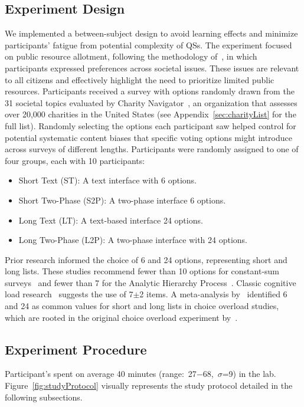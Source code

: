 \subsection{Experiment Design}
We implemented a between-subject design to avoid learning effects and minimize participants' fatigue from potential complexity of QSs. The experiment focused on public resource allotment, following the methodology of~\citet{chengCanShowWhat2021}, in which participants expressed preferences across societal issues. These issues are relevant to all citizens and effectively highlight the need to prioritize limited public resources. Participants received a survey with options randomly drawn from the 31 societal topics evaluated by Charity Navigator~\cite{charitynavigatorCharityNavigator2023}, an organization that assesses over 20,000 charities in the United States (see Appendix~\ref{sec:charityList} for the full list).
Randomly selecting the options each participant saw helped control for potential systematic content biases that specific voting options might introduce across surveys of different lengths. Participants were randomly assigned to one of four groups, each with 10 participants:
\begin{itemize}[leftmargin=*]
    \item Short Text (ST): A text interface with 6 options.
    \item Short Two-Phase (S2P): A two-phase interface 6 options.
    \item Long Text (LT): A text-based interface 24 options.
    \item Long Two-Phase (L2P): A two-phase interface with 24 options.
\end{itemize}

Prior research informed the choice of 6 and 24 options, representing short and long lists. These studies recommend fewer than 10 options for constant-sum surveys~\cite{moroneyQuestionnaireDesignHow2019} and fewer than 7 for the Analytic Hierarchy Process~\cite{saatyPrinciplesAnalyticHierarchy1987}. Classic cognitive load research~\cite{millerMagicalNumberSeven1956, saaty2003magic} suggests the use of 7$\pm$2 items. A meta-analysis by~\citet{chernevChoiceOverloadConceptual2015} identified 6 and 24 as common values for short and long lists in choice overload studies, which are rooted in the original choice overload experiment by~\citet{iyengarWhenChoiceDemotivating2000}.

\subsection{Experiment Procedure}
Participant's spent on average 40 minutes (range:~27$-$68,~$\sigma$=9) in the lab. Figure~\ref{fig:studyProtocol} visually represents the study protocol detailed in the following subsections.

